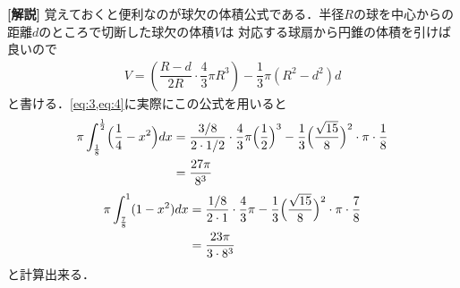 \documentclass[../../main.tex]{subfiles}
\begin{document}
{\bf [解説]}
覚えておくと便利なのが球欠の体積公式である．半径$R$の球を中心からの距離$d$のところで切断した球欠の体積$V$は
対応する球扇から円錐の体積を引けば良いので
\begin{align}
  V = \left( \dfrac{R-d}{2R} \cdot \dfrac{4}{3}\pi R^3 \right) - \dfrac{1}{3}\pi (R^2-d^2) d
\end{align}
と書ける．\cref{eq:3,eq:4}に実際にこの公式を用いると
\begin{align}
  \pi \int_{\frac{1}{8}}^{\frac{1}{2}} \Bigl(\dfrac{1}{4} - x^2\Bigr) dx
  & = \dfrac{3/8}{2 \cdot 1/2} \cdot \dfrac{4}{3} \pi \Bigl(\dfrac{1}{2}\Bigr)^3 - \dfrac{1}{3} \Bigl(\dfrac{\sqrt{15}}{8}\Bigr)^2 \cdot \pi \cdot \dfrac{1}{8}  \\
  &= \dfrac{27 \pi}{8^3}
\end{align}
\begin{align}
  \pi \int_{\frac{7}{8}}^1 (1 - x^2) dx
  &= \dfrac{1/8}{2 \cdot 1} \cdot \dfrac{4}{3} \pi - \dfrac{1}{3} \Bigl(\dfrac{\sqrt{15}}{8}\Bigr)^2 \cdot \pi \cdot \dfrac{7}{8} \\
  &= \dfrac{23 \pi}{3 \cdot 8^3}
\end{align}
と計算出来る．
\end{document}
